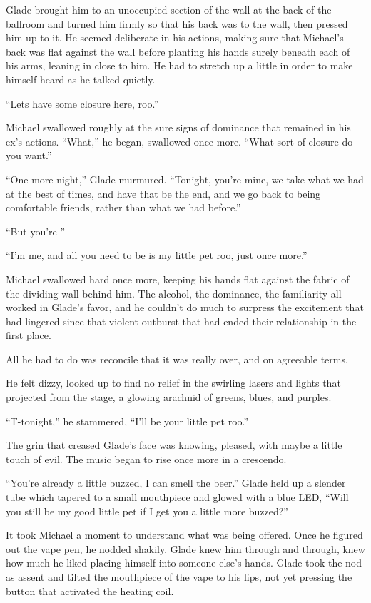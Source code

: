 Glade brought him to an unoccupied section of the wall at the back of the ballroom and turned him firmly so that his back was to the wall, then pressed him up to it.  He seemed deliberate in his actions, making sure that Michael's back was flat against the wall before planting his hands surely beneath each of his arms, leaning in close to him.  He had to stretch up a little in order to make himself heard as he talked quietly.

``Lets have some closure here, roo.''

Michael swallowed roughly at the sure signs of dominance that remained in his ex's actions.  ``What,'' he began, swallowed once more.  ``What sort of closure do you want.''

``One more night,'' Glade murmured.  ``Tonight, you're mine, we take what we had at the best of times, and have that be the end, and we go back to being comfortable friends, rather than what we had before.''

``But you're-''

``I'm me, and all you need to be is my little pet roo, just once more.''

Michael swallowed hard once more, keeping his hands flat against the fabric of the dividing wall behind him.  The alcohol, the dominance, the familiarity all worked in Glade's favor, and he couldn't do much to surpress the excitement that had lingered since that violent outburst that had ended their relationship in the first place.

All he had to do was reconcile that it was really over, and on agreeable terms.

He felt dizzy, looked up to find no relief in the swirling lasers and lights that projected from the stage, a glowing arachnid of greens, blues, and purples.

``T-tonight,'' he stammered, ``I'll be your little pet roo.''

The grin that creased Glade's face was knowing, pleased, with maybe a little touch of evil.  The music began to rise once more in a crescendo.

``You're already a little buzzed, I can smell the beer.''  Glade held up a slender tube which tapered to a small mouthpiece and glowed with a blue LED, ``Will you still be my good little pet if I get you a little more buzzed?''

It took Michael a moment to understand what was being offered.  Once he figured out the vape pen, he nodded shakily.  Glade knew him through and through, knew how much he liked placing himself into someone else's hands.  Glade took the nod as assent and tilted the mouthpiece of the vape to his lips, not yet pressing the button that activated the heating coil.

